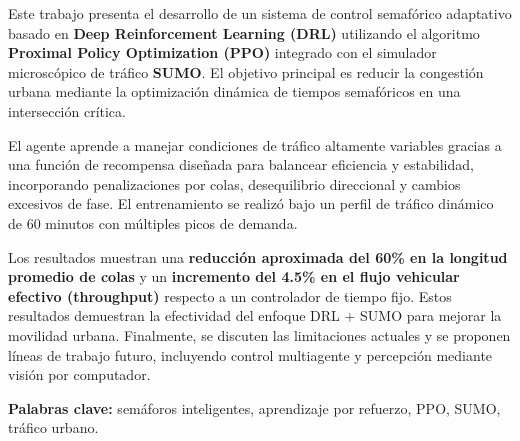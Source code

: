 Este trabajo presenta el desarrollo de un sistema de control semafórico adaptativo basado en \textbf{Deep Reinforcement Learning (DRL)} utilizando el algoritmo \textbf{Proximal Policy Optimization (PPO)} integrado con el simulador microscópico de tráfico \textbf{SUMO}. El objetivo principal es reducir la congestión urbana mediante la optimización dinámica de tiempos semafóricos en una intersección crítica.

El agente aprende a manejar condiciones de tráfico altamente variables gracias a una función de recompensa diseñada para balancear eficiencia y estabilidad, incorporando penalizaciones por colas, desequilibrio direccional y cambios excesivos de fase. El entrenamiento se realizó bajo un perfil de tráfico dinámico de 60 minutos con múltiples picos de demanda.

Los resultados muestran una \textbf{reducción aproximada del 60\% en la longitud promedio de colas} y un \textbf{incremento del 4.5\% en el flujo vehicular efectivo (throughput)} respecto a un controlador de tiempo fijo. Estos resultados demuestran la efectividad del enfoque DRL + SUMO para mejorar la movilidad urbana. Finalmente, se discuten las limitaciones actuales y se proponen líneas de trabajo futuro, incluyendo control multiagente y percepción mediante visión por computador.

\vspace{1em}
\noindent \textbf{Palabras clave:} semáforos inteligentes, aprendizaje por refuerzo, PPO, SUMO, tráfico urbano.